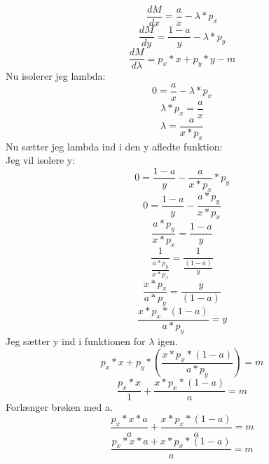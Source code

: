 \documentclass{article}
\begin{document}
\begin{equation}
   \frac{dM}{dx}=\frac{a}{x}-\lambda*p_x
\end{equation}
\begin{equation}
   \frac{dM}{dy}=\frac{1-a}{y}-\lambda*p_y
\end{equation}
\begin{equation}
   \frac{dM}{d\lambda}=p_x*x+p_y*y-m
\end{equation}
Nu isolerer jeg lambda:
\begin{equation}
  0=\frac{a}{x}-\lambda*p_x
\end{equation}
\begin{equation}
  \lambda*p_x=\frac{a}{x}
\end{equation}
\begin{equation}
  \lambda=\frac{a}{x*p_x}
\end{equation}
Nu sætter jeg lambda ind i den y afledte funktion: \\
Jeg vil isolere y: \\
\begin{equation}
   0=\frac{1-a}{y}-\frac{a}{x*p_x}*p_y
\end{equation}
\begin{equation}
   0=\frac{1-a}{y}-\frac{a*p_y}{x*p_x}
\end{equation}
\begin{equation}
   \frac{a*p_y}{x*p_x}=\frac{1-a}{y}
\end{equation}
\begin{equation}
   \frac{1}{\frac{a*p_y}{x*p_x}}=\frac{1}{\frac{(1-a)}{y}}
\end{equation}
\begin{equation}
   \frac{x*p_x}{a*p_y}=\frac{y}{(1-a)}
\end{equation}
\begin{equation}
   \frac{x*p_x*(1-a)}{a*p_y}=y
\end{equation}
Jeg sætter y ind i funktionen for $\lambda$ igen.
\begin{equation}
   p_x*x+p_y*(\frac{x*p_x*(1-a)}{a*p_y})=m
\end{equation}
\begin{equation}
   \frac{p_x*x}{1}+\frac{x*p_x*(1-a)}{a}=m
\end{equation}
Forlænger brøken med a.
\begin{equation}
   \frac{p_x*x*a}{a}+\frac{x*p_x*(1-a)}{a}=m
\end{equation}
\begin{equation}
   \frac{p_x*x*a+x*p_x*(1-a)}{a}=m
\end{equation}
\end{document}
